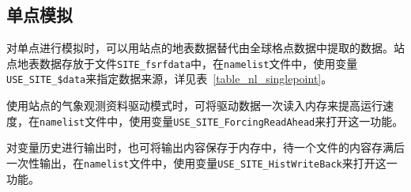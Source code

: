 \documentclass[a4paper,12pt,twoside]{article}
\begin{document}
\subsection{单点模拟}

对单点进行模拟时，可以用站点的地表数据替代由全球格点数据中提取的数据。站点地表数据存放于文件\texttt{SITE\_fsrfdata}中，在\texttt{namelist}文件中，使用变量\texttt{USE\_SITE\_\allowbreak\$data}来指定数据来源，详见表~\ref{table_nl_singlepoint}。

使用站点的气象观测资料驱动模式时，可将驱动数据一次读入内存来提高运行速度，在\texttt{namelist}文件中，使用变量\texttt{USE\_SITE\_ForcingReadAhead}来打开这一功能。

对变量历史进行输出时，也可将输出内容保存于内存中，待一个文件的内容存满后一次性输出，在\texttt{namelist}文件中，使用变量\texttt{USE\_SITE\_HistWriteBack}来打开这一功能。
\end{document}
